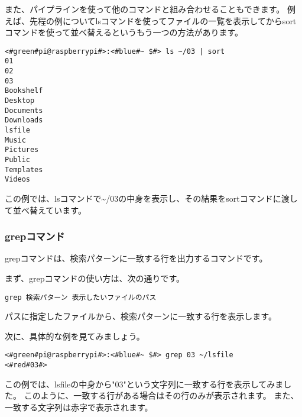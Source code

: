 また、パイプラインを使って他のコマンドと組み合わせることもできます。
例えば、先程の例についてlsコマンドを使ってファイルの一覧を表示してからsortコマンドを使って並べ替えるというもう一つの方法があります。

\begin{lstlisting}[caption=パイプラインを用いたsortコマンドの実行例, label=sort_example]
<#green#pi@raspberrypi#>:<#blue#~ $#> ls ~/03 | sort
01
02
03
Bookshelf
Desktop
Documents
Downloads
lsfile
Music
Pictures
Public
Templates
Videos
\end{lstlisting}

この例では、lsコマンドで\textasciitilde/03の中身を表示し、その結果をsortコマンドに渡して並べ替えています。

\begin{tcolorbox}[title=\useOmetoi]
    \begin{enumerate}
    \end{enumerate}
\end{tcolorbox}

\subsubsection{grepコマンド}
grepコマンドは、検索パターンに一致する行を出力するコマンドです。

まず、grepコマンドの使い方は、次の通りです。

\begin{lstlisting}[caption=grepコマンドの使い方, label=grep_usage]
grep 検索パターン 表示したいファイルのパス
\end{lstlisting}

パスに指定したファイルから、検索パターンに一致する行を表示します。

次に、具体的な例を見てみましょう。

\begin{lstlisting}[caption=grepコマンドの実行例, label=grep_example]
<#green#pi@raspberrypi#>:<#blue#~ $#> grep 03 ~/lsfile
<#red#03#>
\end{lstlisting}

この例では、lsfileの中身から"03"という文字列に一致する行を表示してみました。
このように、一致する行がある場合はその行のみが表示されます。
また、一致する文字列は赤字で表示されます。

\begin{tcolorbox}[title=\useOmetoi]
    \begin{enumerate}
    \end{enumerate}
\end{tcolorbox}

